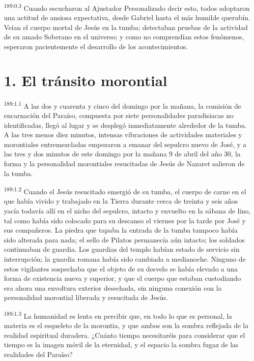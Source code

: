 \par
\textsuperscript{189:0.3} Cuando escucharon al Ajustador Personalizado decir esto, todos adoptaron una actitud de ansiosa expectativa, desde Gabriel hasta el más humilde querubín. Veían el cuerpo mortal de Jesús en la tumba; detectaban pruebas de la actividad de su amado Soberano en el universo; y como no comprendían estos fenómenos, esperaron pacientemente el desarrollo de los acontecimientos.

\section*{1. El tránsito morontial}
\par
\textsuperscript{189:1.1} A las dos y cuarenta y cinco del domingo por la mañana, la comisión de encarnación del Paraíso, compuesta por siete personalidades paradisiacas no identificadas, llegó al lugar y se desplegó inmediatamente alrededor de la tumba. A las tres menos diez minutos, intensas vibraciones de actividades materiales y morontiales entremezcladas empezaron a emanar del sepulcro nuevo de José, y a las tres y dos minutos de este domingo por la mañana 9 de abril del año 30, la forma y la personalidad morontiales resucitadas de Jesús de Nazaret salieron de la tumba.

\par
\textsuperscript{189:1.2} Cuando el Jesús resucitado emergió de su tumba, el cuerpo de carne en el que había vivido y trabajado en la Tierra durante cerca de treinta y seis años yacía todavía allí en el nicho del sepulcro, intacto y envuelto en la sábana de lino, tal como había sido colocado para su descanso el viernes por la tarde por José y sus compañeros. La piedra que tapaba la entrada de la tumba tampoco había sido alterada para nada; el sello de Pilatos permanecía aún intacto; los soldados continuaban de guardia. Los guardias del templo habían estado de servicio sin interrupción; la guardia romana había sido cambiada a medianoche. Ninguno de estos vigilantes sospechaba que el objeto de su desvelo se había elevado a una forma de existencia nueva y superior, y que el cuerpo que estaban custodiando era ahora una envoltura exterior desechada, sin ninguna conexión con la personalidad morontial liberada y resucitada de Jesús.

\par
\textsuperscript{189:1.3} La humanidad es lenta en percibir que, en todo lo que es personal, la materia es el esqueleto de la morontia, y que ambos son la sombra reflejada de la realidad espiritual duradera. ¿Cuánto tiempo necesitaréis para considerar que el tiempo es la imagen móvil de la eternidad, y el espacio la sombra fugaz de las realidades del Paraíso?

